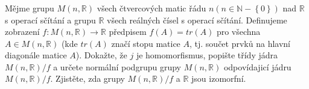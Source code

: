 \subsubsection{}
Mějme grupu $M(n, \mathbb{R})$ všech čtvercových matic řádu $n(n \in \mathbb{N}
- \left \{ 0 \right \})$ nad $\mathbb{R}$ s operací sčítání a grupu $\mathbb{R}$
všech reálných čísel s operací sčítání. Definujeme zobrazení $f : M (n,
\mathbb{R}) \rightarrow \mathbb{R}$ předpisem $f(A)=tr(A)$ pro všechna $A \in
M(n, \mathbb{R})$ (kde $tr(A)$ značí stopu matice $A$, tj. součet prvků na
hlavní diagonále matice $A$).  Dokažte, že $j$ je homomorfismus, popište třídy
jádra $M(n, \mathbb{R})/f$ a určete normální podgrupu grupy $M(n, \mathbb{R})$
odpovídajicí jádru $M(n, \mathbb{R})/f$. Zjistěte, zda grupy $M(n,
\mathbb{R})/f$ a $\mathbb{R}$ jsou izomorfní.
